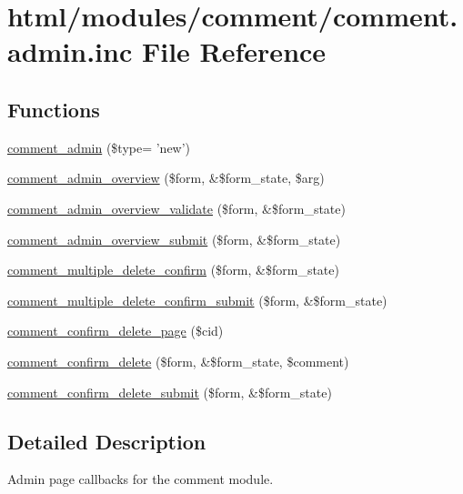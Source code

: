 \hypertarget{comment_8admin_8inc}{
\section{html/modules/comment/comment.admin.inc File Reference}
\label{comment_8admin_8inc}
}
\subsection*{Functions}
\begin{DoxyCompactItemize}
\item 
\hyperlink{comment_8admin_8inc_afe7a967aebd51b588b647caada9b506a}{comment\_\-admin} (\$type= 'new')
\item 
\hyperlink{group__forms_ga73d86cbdbe6e2e14ca63fa234e9789b3}{comment\_\-admin\_\-overview} (\$form, \&\$form\_\-state, \$arg)
\item 
\hyperlink{comment_8admin_8inc_a60a994bc18cf6f4a9a71a478700f973e}{comment\_\-admin\_\-overview\_\-validate} (\$form, \&\$form\_\-state)
\item 
\hyperlink{comment_8admin_8inc_ae242a86117c7b818ad449f42dd63706c}{comment\_\-admin\_\-overview\_\-submit} (\$form, \&\$form\_\-state)
\item 
\hyperlink{group__forms_ga9c94271c79747235e0914e4f0ee9be8e}{comment\_\-multiple\_\-delete\_\-confirm} (\$form, \&\$form\_\-state)
\item 
\hyperlink{comment_8admin_8inc_a0995d69b00481eb46c1981112df0999f}{comment\_\-multiple\_\-delete\_\-confirm\_\-submit} (\$form, \&\$form\_\-state)
\item 
\hyperlink{comment_8admin_8inc_ae6452e8b6d18bd6ddaa006ceec5c7edf}{comment\_\-confirm\_\-delete\_\-page} (\$cid)
\item 
\hyperlink{group__forms_gae661cbb8f0f988f538980296a6f062c8}{comment\_\-confirm\_\-delete} (\$form, \&\$form\_\-state, \$comment)
\item 
\hyperlink{comment_8admin_8inc_a4a91e7877e246726a22e875c215845bd}{comment\_\-confirm\_\-delete\_\-submit} (\$form, \&\$form\_\-state)
\end{DoxyCompactItemize}


\subsection{Detailed Description}
Admin page callbacks for the comment module. 

